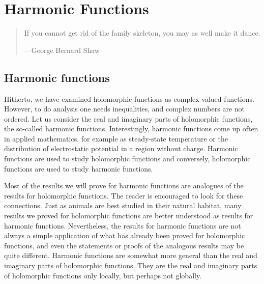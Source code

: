 \documentclass[12pt,openany]{book}
\theoremstyle{plain}
\theoremstyle{remark}
\theoremstyle{definition}
\newenvironment{myepigraph}{%
    \begin{quote}%
    \begingroup\itshape
}{%
    \endgroup%
    \end{quote}
}
\theoremstyle{exercise}
\theoremstyle{example}
\begin{document}

\chapter{Harmonic Functions} \label{ch:harmonic}

\begin{myepigraph}
If you cannot get rid of the family skeleton, you may as well make it
dance.

---George Bernard Shaw
\end{myepigraph}


\section{Harmonic functions}
\label{sec:harmonic}

Hitherto, we have examined holomorphic functions as complex-valued functions.
However, to do analysis one needs inequalities, and complex numbers are not
ordered.  Let us consider the real and imaginary parts of holomorphic
functions, the so-called harmonic functions.  Interestingly, harmonic
functions come up often in applied mathematics, for example as steady-state
temperature or the distribution of electrostatic potential in a region without
charge.  Harmonic functions are used to study
holomorphic functions and conversely, holomorphic functions are used to
study harmonic functions.

Most of the results
we will prove for harmonic functions are analogues of the results 
for holomorphic functions.  The reader is
encouraged to look for these connections.
Just as animals are best studied in their natural habitat,
many results we proved for holomorphic functions are
better understood as results for harmonic functions.
Nevertheless, the results for harmonic functions are not
always a simple application of what has already been proved for holomorphic
functions, and even the
statements or proofs of the analogous results may be quite different.
Harmonic functions are somewhat more general than the real and
imaginary parts of holomorphic functions.  They are the real and imaginary parts
of holomorphic functions only locally, but perhaps not globally.
\end{document}
